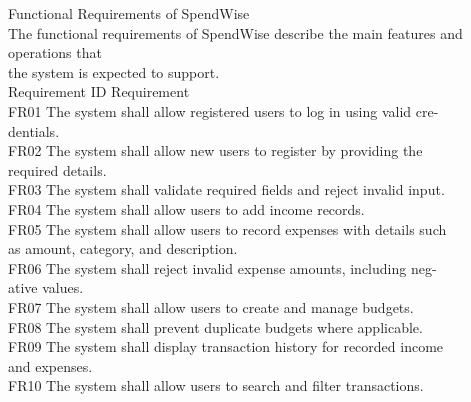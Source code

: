 \documentclass[12pt,a4paper]{report}
\begin{document}
\smallskip

 Functional Requirements of SpendWise\\ 

\smallskip
The functional requirements of SpendWise describe the main features and operations that\\ 
the system is expected to support.\\ 

\smallskip
Requirement ID            Requirement\\ 

\smallskip
FR01                      The system shall allow registered users to log in using valid cre-\\ 
dentials.\\ 

\smallskip
FR02                      The system shall allow new users to register by providing the\\ 
required details.\\ 

\smallskip
FR03                      The system shall validate required fields and reject invalid input.\\ 

\smallskip
FR04                      The system shall allow users to add income records.\\ 

\smallskip
FR05                      The system shall allow users to record expenses with details such\\ 
as amount, category, and description.\\ 

\smallskip
FR06                      The system shall reject invalid expense amounts, including neg-\\ 
ative values.\\ 

\smallskip
FR07                      The system shall allow users to create and manage budgets.\\ 

\smallskip
FR08                      The system shall prevent duplicate budgets where applicable.\\ 

\smallskip
FR09                      The system shall display transaction history for recorded income\\ 
and expenses.\\ 

\smallskip
FR10                      The system shall allow users to search and filter transactions.\\ 
\end{document}
